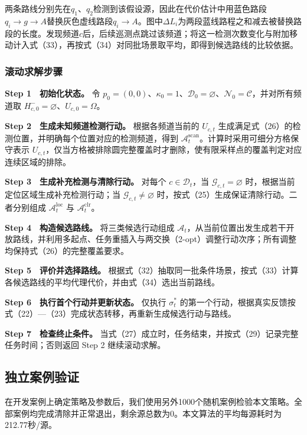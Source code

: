 两条路线分别先在\(q_1\)、\(q_2\)检测到该假设源，因此在代价估计中用蓝色路段\(q_i\to g\to A\)替换灰色虚线路段\(q_i\to A\)。图中\(\Delta L_i\)为两段蓝线路程之和减去被替换路段的长度。发现频道\(c\)后，后续巡测点跳过该频道；将这一检测次数变化与附加移动计入式（33），再按式（34）对同批场景取平均，即得到候选路线的比较依据。

\subsubsection{滚动求解步骤}

\textbf{Step 1　初始化状态。} 令 \(p_0=(0,0)\)、\(\kappa_0=1\)、\(\mathcal D_0=\varnothing\)、\(\mathcal N_0=\mathcal C\)，并对所有频道取 \(H^-_{c,0}=\varnothing\)、\(U_{c,0}=\Omega\)。

\textbf{Step 2　生成未知频道检测行动。} 根据各频道当前的 \(U_{c,t}\) 生成满足式（26）的检测位置，并明确每个位置对应的检测频道，得到 \(\mathcal A_t^{\mathrm{scan}}\)。计算时采用可细分方格保守表示 \(U_{c,t}\)，仅当方格被排除圆完整覆盖时才删除，使有限采样点的覆盖判定对应连续区域的排除。

\textbf{Step 3　生成补充检测与清除行动。} 对每个 \(c\in\mathcal D_t\)，当 \(\mathcal G_{c,t}=\varnothing\) 时，根据当前定位区域生成补充检测行动；当 \(\mathcal G_{c,t}\ne\varnothing\) 时，按式（25）生成保证清除行动。二者分别组成 \(\mathcal A_t^{\mathrm{loc}}\) 与 \(\mathcal A_t^{\mathrm{clr}}\)。

\textbf{Step 4　构造候选路线。} 将三类候选行动组成 \(\mathcal A_t\)，从当前位置出发生成若干开放路线，并利用多起点、任务重插入与两交换（2-opt）调整行动次序；所有调整均保持式（26）的完整覆盖要求。

\textbf{Step 5　评价并选择路线。} 根据式（32）抽取同一批条件场景，按式（33）计算各候选路线的平均代理代价，并由式（34）选出当前路线。

\textbf{Step 6　执行首个行动并更新状态。} 仅执行 \(\sigma_t^*\) 的第一个行动，根据真实反馈按式（22）---（23）完成状态转移，再重新生成候选行动与路线。

\textbf{Step 7　检查终止条件。} 当式（27）成立时，任务结束，并按式（29）记录完整任务时间；否则返回 Step 2 继续滚动求解。

\subsection{独立案例验证}

在开发案例上确定策略及参数后，我们使用另外1000个随机案例检验本文策略。全部案例均完成清除并正常退出，剩余源总数为0。本文算法的平均每源耗时为212.77秒/源。

